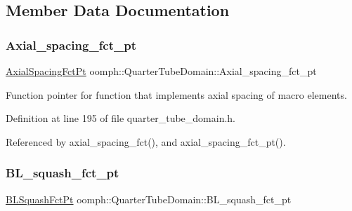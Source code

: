 \subsection{Member Data Documentation}
\mbox{\label{classoomph_1_1QuarterTubeDomain_ad084b0e50d50b1948c2e9a600e3dcbd0}} 
\subsubsection{\texorpdfstring{Axial\+\_\+spacing\+\_\+fct\+\_\+pt}{Axial\_spacing\_fct\_pt}}
{\footnotesize\ttfamily \hyperlink{classoomph_1_1QuarterTubeDomain_ae347af42a5dcb9b3b82c2247975b01db}{Axial\+Spacing\+Fct\+Pt} oomph\+::\+Quarter\+Tube\+Domain\+::\+Axial\+\_\+spacing\+\_\+fct\+\_\+pt\hspace{0.3cm}{\ttfamily [private]}}



Function pointer for function that implements axial spacing of macro elements. 



Definition at line 195 of file quarter\+\_\+tube\+\_\+domain.\+h.



Referenced by axial\+\_\+spacing\+\_\+fct(), and axial\+\_\+spacing\+\_\+fct\+\_\+pt().

\mbox{\label{classoomph_1_1QuarterTubeDomain_a2c55367b6f92fa1928326b8e0c62115b}} 
\subsubsection{\texorpdfstring{B\+L\+\_\+squash\+\_\+fct\+\_\+pt}{BL\_squash\_fct\_pt}}
{\footnotesize\ttfamily \hyperlink{classoomph_1_1QuarterTubeDomain_a3d8c15c17d9912d8c519c028437c0b2c}{B\+L\+Squash\+Fct\+Pt} oomph\+::\+Quarter\+Tube\+Domain\+::\+B\+L\+\_\+squash\+\_\+fct\+\_\+pt\hspace{0.3cm}{\ttfamily [private]}}



